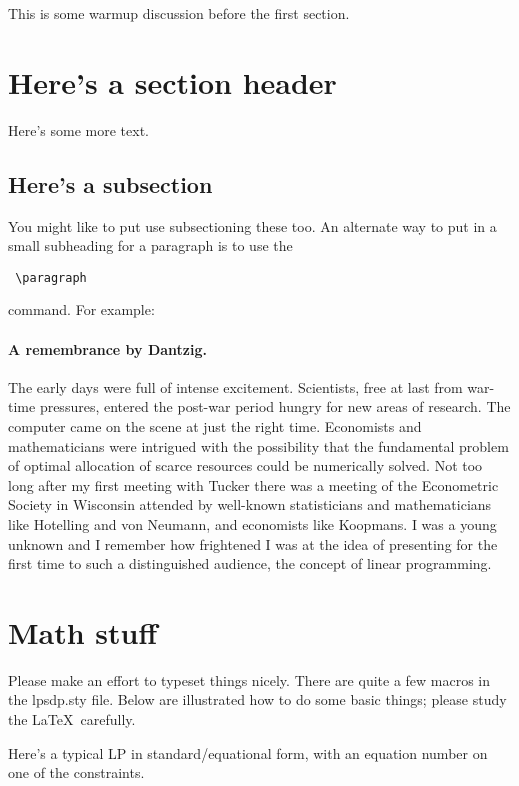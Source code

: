 \documentclass[12pt]{article}
\begin{document}


This is some warmup discussion before the first section.

\section{Here's a section header}

Here's some more text.

\subsection{Here's a subsection}

You might like to put use subsectioning these too.  An alternate way to put in a small subheading for a paragraph is to use the \begin{verbatim} \paragraph \end{verbatim} command.  For example:

\paragraph{A remembrance by Dantzig.}  The early days were full of intense excitement. Scientists, free at last from war-time pressures, entered the post-war period hungry for new areas of research. The computer came on the scene at just the right time. Economists and mathematicians were intrigued with the possibility that the fundamental problem of optimal allocation of scarce resources could be numerically solved. Not too long after my first meeting with Tucker there was a meeting of the Econometric Society in Wisconsin attended by well-known statisticians and mathematicians like Hotelling and von Neumann, and economists like Koopmans. I was a young unknown and I remember how frightened I was at the idea of presenting for the first time to such a distinguished audience, the concept of linear programming.



\section{Math stuff}

Please make an effort to typeset things nicely.  There are quite a few macros in the lpsdp.sty file.  Below are illustrated how to do some basic things; please study the \LaTeX\ carefully.

Here's a typical LP in standard/equational form, with an equation number on one of the constraints.





\end{document}
